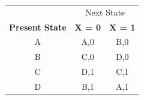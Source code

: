 \documentclass{beamer}
\begin{document}
\begin{frame}
	\begin{center}
		\begin{tabular}{ccc}
			\hline
			& \multicolumn{2}{c}{Next State}\\
			\cline{2-3}
			\textbf{Present State} & \textbf{X = 0} & \textbf{X = 1}\\
			\hline
			A & A,0 & B,0\\
			B & C,0 & D,0\\
			C & D,1 & C,1\\
			D & B,1 & A,1\\
			\hline
		\end{tabular}
	\end{center} 
\end{frame}
\end{document}
